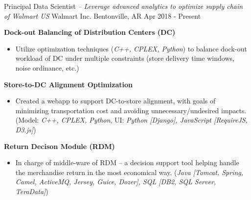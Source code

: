 

\begin{cventries}


\cventry
{Principal Data Scientist \textit{ -- Leverage advanced analytics to optimize supply chain of Walmart US}}          %
{Walmart Inc.}                      %
{Bentonville, AR}                   %
{Apr 2018 - Present}                    %
{
    \begin{cvitems}
    \item {
        \textbf{Dock-out Balancing of Distribution Centers (DC)}  
        \begin{itemize}
            \item  Utilize optimization techniques (\textit{C++, CPLEX, Python}) to balance dock-out workload of DC under multiple constraints (store delivery time windows, noise ordinance, etc.) 
        \end{itemize}           
    }
    \item {
        \textbf{Store-to-DC Alignment Optimization} 
        \begin{itemize}
            \item  Created a webapp to support DC-to-store alignment, with goals of minimizing transportation cost and avoiding unnecessary/undesired impacts. 
            (Model: \textit{C++, CPLEX, Python}, UI: \textit{Python [Django], JavaScript [RequireJS, D3.js]}) 
        \end{itemize}           
    }
    \item {
        \textbf{Return Decison Module (RDM)} 
        \begin{itemize}
            \item  In charge of middle-ware of RDM -- a decision support tool helping handle the merchandise return in the most economical way. 
                   (\textit{Java [Tomcat, Spring, Camel, ActiveMQ, Jersey, Guice, Dozer], SQL [DB2, SQL Server, TeraData]})
        \end{itemize}           
    }
    \end{cvitems}%
}


\end{cventries}
